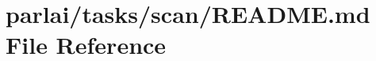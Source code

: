 \hypertarget{parlai_2tasks_2scan_2README_8md}{}\section{parlai/tasks/scan/\+R\+E\+A\+D\+ME.md File Reference}
\label{parlai_2tasks_2scan_2README_8md}
